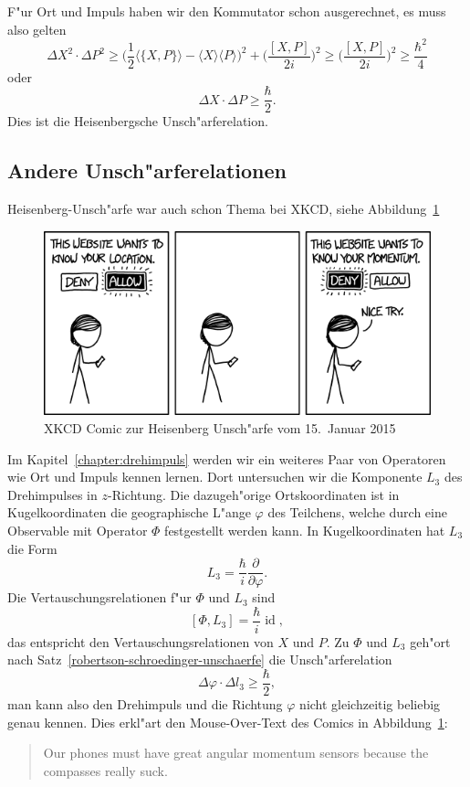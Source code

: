 F"ur Ort und Impuls haben wir den Kommutator schon ausgerechnet, es
muss also gelten
\begin{equation}
\Delta X^2\cdot \Delta P^2
\ge
\biggl(
\frac12\langle \{X,P\}\rangle - \langle X\rangle\langle P\rangle
\biggr)^2
+
\biggl(
\frac{[X,P]}{2i}
\biggr)^2
\ge
\biggl(
\frac{[X,P]}{2i}
\biggr)^2
\ge \frac{\hbar^2}4
\end{equation}
oder
\begin{equation}
\Delta X\cdot\Delta P\ge \frac{\hbar}2.
\end{equation}
Dies ist die Heisenbergsche Unsch"arferelation. 

\subsection{Andere Unsch"arferelationen}
Heisenberg-Unsch"arfe war auch schon Thema bei XKCD, siehe
Abbildung~\ref{heisenberg:xkcd}
\begin{figure}
\centering
\includegraphics[width=0.8\hsize]{images/xkcd-location-sharing.png}
\caption{XKCD Comic zur Heisenberg Unsch"arfe vom 15.~Januar 2015
\label{heisenberg:xkcd}}
\end{figure}
Im Kapitel~\ref{chapter:drehimpuls} werden wir ein weiteres Paar
von Operatoren wie Ort und Impuls kennen lernen.
Dort untersuchen wir die Komponente $L_3$ des Drehimpulses in $z$-Richtung.
Die dazugeh"orige Ortskoordinaten ist in Kugelkoordinaten die geographische 
L"ange $\varphi$ des Teilchens, welche durch eine Observable mit Operator
$\Phi$ festgestellt werden kann.
In Kugelkoordinaten hat $L_3$ die Form
\[
L_3=\frac{\hbar}{i}\frac{\partial}{\partial\varphi}.
\]
Die Vertauschungsrelationen f"ur $\Phi$ und $L_3$ sind
\[
[\Phi,L_3]=\frac{\hbar}{i}\operatorname{id},
\]
das entspricht den Vertauschungsrelationen von $X$ und $P$.
Zu $\Phi$ und $L_3$ geh"ort nach Satz~\ref{robertson-schroedinger-unschaerfe}
die Unsch"arferelation
\[
\Delta\varphi\cdot\Delta l_3 \ge \frac{\hbar}2,
\]
man kann also den Drehimpuls und die Richtung $\varphi$ nicht gleichzeitig
beliebig genau kennen.
Dies erkl"art den Mouse-Over-Text des Comics in
Abbildung~\ref{heisenberg:xkcd}:
\begin{quote}
Our phones must have great angular momentum sensors because
the compasses really suck.
\end{quote}
